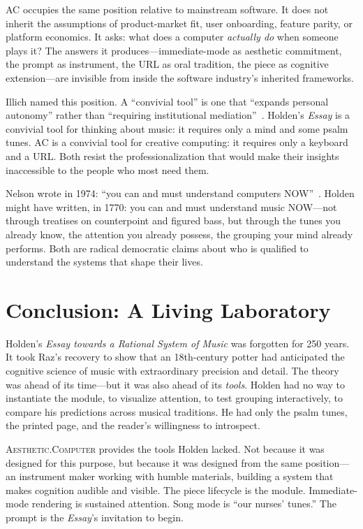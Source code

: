 \documentclass[10pt,letterpaper,twocolumn]{article}
\newcommand{\ac}{\textsc{Aesthetic.Computer}}
\begin{document}
AC occupies the same position relative to mainstream software. It does not inherit the assumptions of product-market fit, user onboarding, feature parity, or platform economics. It asks: what does a computer \emph{actually do} when someone plays it? The answers it produces---immediate-mode as aesthetic commitment, the prompt as instrument, the URL as oral tradition, the piece as cognitive extension---are invisible from inside the software industry's inherited frameworks.

Illich named this position. A ``convivial tool'' is one that ``expands personal autonomy'' rather than ``requiring institutional mediation''~\citep{illich1973}. Holden's \emph{Essay} is a convivial tool for thinking about music: it requires only a mind and some psalm tunes. AC is a convivial tool for creative computing: it requires only a keyboard and a URL. Both resist the professionalization that would make their insights inaccessible to the people who most need them.

Nelson wrote in 1974: ``you can and must understand computers NOW''~\citep{nelson1974}. Holden might have written, in 1770: you can and must understand music NOW---not through treatises on counterpoint and figured bass, but through the tunes you already know, the attention you already possess, the grouping your mind already performs. Both are radical democratic claims about who is qualified to understand the systems that shape their lives.

\section{Conclusion: A Living Laboratory}

Holden's \emph{Essay towards a Rational System of Music} was forgotten for 250 years. It took Raz's recovery to show that an 18th-century potter had anticipated the cognitive science of music with extraordinary precision and detail. The theory was ahead of its time---but it was also ahead of its \emph{tools}. Holden had no way to instantiate the module, to visualize attention, to test grouping interactively, to compare his predictions across musical traditions. He had only the psalm tunes, the printed page, and the reader's willingness to introspect.

\ac{} provides the tools Holden lacked. Not because it was designed for this purpose, but because it was designed from the same position---an instrument maker working with humble materials, building a system that makes cognition audible and visible. The piece lifecycle is the module. Immediate-mode rendering is sustained attention. Song mode is ``our nurses' tunes.'' The prompt is the \emph{Essay}'s invitation to begin.
\end{document}
